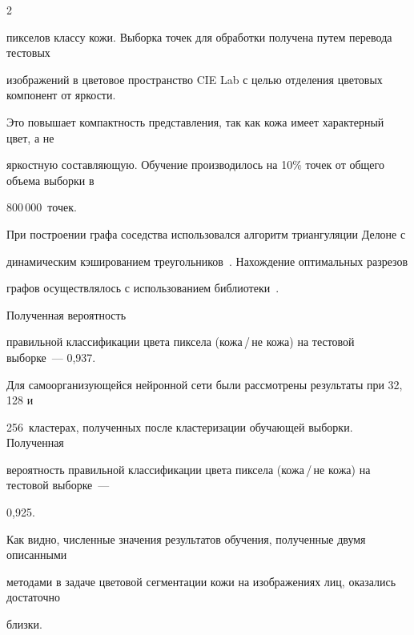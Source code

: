 \begin{multicols}{2}
      

      

      

      \noindent 

пикселов классу кожи. Выборка точек для обработки получена путем перевода тестовых 

изображений в цветовое пространство CIE Lab с целью отделения цветовых компонент от яркости. 

Это повышает компактность представления, так как  кожа имеет характерный цвет, а не 

яркостную составляющую. Обучение производилось на 10\% точек от общего объема выборки в 

800\,000~точек. 

      

      При построении графа соседства использовался алгоритм триангуляции Делоне с 

динамическим кэшированием треугольников~\cite{15v}. Нахождение оптимальных разрезов 

графов осуществлялось с использованием библиотеки~\cite{16v}. 



Полученная вероятность 

правильной классификации цвета пиксела (кожа\,/\,не кожа) на тестовой выборке~--- 0,937.



      Для самоорганизующейся нейронной сети были рассмотрены результаты при 32, 128 и 

256~клас\-те\-рах,  полученных после кластеризации обуча\-ющей выборки. Полученная 

вероятность правильной классификации цвета пиксела (кожа\,/\,не кожа) на тес\-то\-вой выборке~--- 

0,925.



Как видно, численные значения результатов обучения, полученные двумя описанными 

методами в задаче цветовой сегментации кожи на изоб\-ра\-же\-ни\-ях лиц, оказались достаточно 

близки.  %





      \end{multicols}

      

